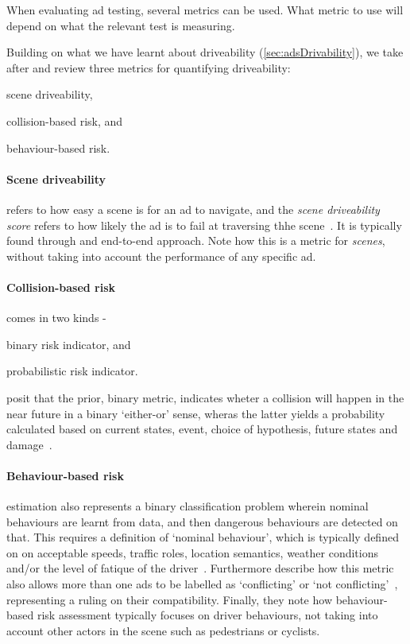 When evaluating \acrshort{ad} testing, several metrics can be used. What metric to use will depend
on what the relevant test is measuring.

Building on what we have learnt about driveability (\cref{sec:adsDrivability}),
we take after \citeauthor{safeToDrive} and review three metrics for
quantifying driveability: \begin{inparaenum}
    \item scene driveability,
    \item collision-based risk, and
    \item behaviour-based risk.
\end{inparaenum}

\paragraph{Scene driveability} refers to how easy a scene is for an
\acrshort{ad} to navigate, and the \textit{scene driveability score} refers to
how likely the \acrlong{ad} is to fail at traversing thhe
scene~\cite[3140]{safeToDrive}. It is typically found through and end-to-end
approach. Note how this is a metric for \textit{scenes}, without taking into
account the performance of any specific \acrshort{ad}.

\paragraph{Collision-based risk} comes in two kinds - \begin{inparaenum}
    \item binary risk indicator, and
    \item probabilistic risk indicator.
\end{inparaenum} \citeauthor{safeToDrive} posit that the prior, binary metric, indicates wheter a
collision will happen in the near future in a binary `either-or' sense, wheras the latter yields a
probability calculated based on current states, event, choice of hypothesis, future states and
damage~\cite[3140]{safeToDrive}.

\paragraph{Behaviour-based risk} estimation also represents a binary classification problem wherein
nominal behaviours are learnt from data, and then dangerous behaviours are detected on that. This
requires a definition of `nominal behaviour', which is typically defined on on acceptable speeds,
traffic roles, location semantics, weather conditions and/or the level of fatique of the
driver~\cite[3140]{safeToDrive}. Furthermore \citeauthor{safeToDrive} describe how this metric also
allows more than one \acrshort{ads} to be labelled as `conflicting' or `not
conflicting'~\cite[3140]{safeToDrive}, representing a ruling on their compatibility. Finally, they
note how behaviour-based risk assessment typically focuses on driver behaviours, not taking into
account other actors in the scene such as pedestrians or cyclists.

